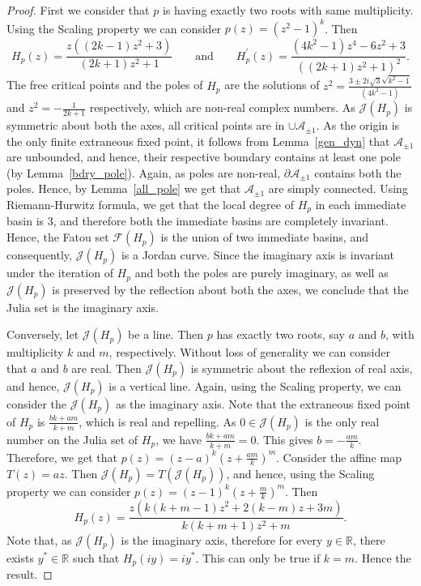 \documentclass[10pt,a4paper]{amsart}
\begin{document}
\begin{proof}
First we consider that $p$ is having exactly two roots with same multiplicity. Using the Scaling property we can consider $p(z)=\left(z^{2}-1\right)^{k}$. Then	$$
H_{p}(z)=\frac{z\left((2 k-1) z^{2}+3\right)}{(2 k+1) z^{2}+1}\qquad\text{and}\qquad H_{p}^{\prime}(z)=\frac{\left(4 k^{2}-1\right) z^{4}-6 z^{2}+3}{\left((2 k+1) z^{2}+1\right)^{2}}.
$$
The free critical points and the poles of $H_p$ are the solutions of
$ z^{2}=\frac{3 \pm 2i \sqrt{3} \sqrt{k^{2}-1}}{\left(4 k^{2}-1\right)}$ and $z^2=- \frac{1}{2k+1}$ respectively, which are non-real complex numbers.
As $\mathcal{J}(H_{p})$ is symmetric about both the axes, all critical points are in $\cup \mathcal{A}_{ \pm 1}$. As the origin is the only finite extraneous fixed point, it follows from Lemma~\ref{gen_dyn} that
$\mathcal{A}_{ \pm 1}$ are unbounded, and hence, their respective boundary contains at least one pole (by Lemma~\ref{bdry_pole}). Again, as poles are non-real, $\partial \mathcal{A}_{ \pm 1}$ contains both the poles. Hence, by Lemma~\ref{all_pole} we get that
$\mathcal{A}_{\pm 1}$ are simply connected. Using Riemann-Hurwitz formula, we get that the local degree of $H_p$ in each immediate basin is $3$, and therefore both the immediate basins are completely invariant. Hence, the Fatou set $\mathcal{F}(H_p)$ is the union of two immediate basins, and consequently, $\mathcal{J}(H_p)$ is a Jordan curve. Since the imaginary axis is invariant under the iteration of $H_{p}$ and both the poles are purely imaginary, as well as $\mathcal{J}(H_p)$ is preserved by the reflection about both the axes, we conclude that the Julia set is the imaginary axis.
\par
Conversely, let $\mathcal{J}(H_p)$ be a line.
Then $ p$ has exactly two roots, say $a$ and $b$, with multiplicity $k$ and $m$, respectively. Without loss of generality we can consider that $a$ and $ b$ are real.
Then $\mathcal{J}(H_p)$ is symmetric about the reflexion of real axis, and hence, $\mathcal{J}(H_{p})$ is a vertical line.
Again, using the Scaling property, we can consider the $\mathcal{J}(H_{p})$ as the imaginary axis. Note that the extraneous fixed point of $H_p$ is $\frac{b k+a m}{k+m}$, which is real and repelling. As $0 \in \mathcal{J}(H_p)$ is the only real number on the Julia set of $H_p$, we have
$
\frac{b k+a m}{k+m}=0$. This gives $b=-\frac{a m}{k} .
$
Therefore, we get that $ p(z)=(z-a)^{k}\left(z+\frac{a m}{k}\right)^{m} .
$ Consider the affine map $T(z)=a z$. Then $\mathcal{J}\left(H_{p}\right)=T\left(\mathcal{J}\left(H_{p}\right)\right)$, and hence, using the Scaling property we can consider
$
p(z)=(z-1)^{k}\left(z+\frac{m}{k}\right)^{m} .
$
Then $$H_{p}(z)=\frac{z\left(k(k+m-1) z^{2}+2(k-m) z+3 m\right)}{k(k+m+1) z^{2}+m}.$$
Note that, as $\mathcal{J}(H_{p})$ is the imaginary axis, therefore for every $y \in \mathbb{R}$, there exists $y^{*} \in \mathbb{R}$ such that
$H_{p}(i y)=i y^{*}.$
This can only be true if $k=m$.
Hence the result.
\end{proof}
\end{document}
